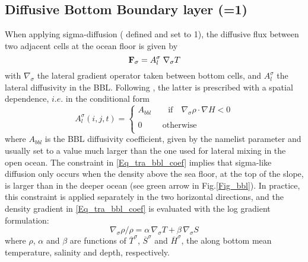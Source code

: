\documentclass[NEMO_book]{subfiles}
\begin{document}
\subsection{Diffusive Bottom Boundary layer (=1)}
\label{TRA_bbl_diff}

When applying sigma-diffusion ( defined and  set to 1), 
the diffusive flux between two adjacent cells at the ocean floor is given by 
\begin{equation} \label{Eq_tra_bbl_diff}
{\rm {\bf F}}_\sigma=A_l^\sigma \; \nabla_\sigma T
\end{equation} 
with $\nabla_\sigma$ the lateral gradient operator taken between bottom cells, 
and  $A_l^\sigma$ the lateral diffusivity in the BBL. Following \citet{Beckmann_Doscher1997}, 
the latter is prescribed with a spatial dependence, $i.e.$ in the conditional form
\begin{equation} \label{Eq_tra_bbl_coef}
A_l^\sigma (i,j,t)=\left\{ {\begin{array}{l}
 A_{bbl}  \quad \quad   \mbox{if}  \quad   \nabla_\sigma \rho  \cdot  \nabla H<0 \\ 
 \\
 0\quad \quad \;\,\mbox{otherwise} \\ 
 \end{array}} \right.
\end{equation} 
where $A_{bbl}$ is the BBL diffusivity coefficient, given by the namelist 
parameter  and usually set to a value much larger 
than the one used for lateral mixing in the open ocean. The constraint in \eqref{Eq_tra_bbl_coef} 
implies that sigma-like diffusion only occurs when the density above the sea floor, at the top of 
the slope, is larger than in the deeper ocean (see green arrow in Fig.\ref{Fig_bbl}). 
In practice, this constraint is applied separately in the two horizontal directions, 
and the density gradient in \eqref{Eq_tra_bbl_coef} is evaluated with the log gradient formulation: 
\begin{equation} \label{Eq_tra_bbl_Drho}
	\nabla_\sigma \rho / \rho = \alpha \,\nabla_\sigma T + \beta   \,\nabla_\sigma S
\end{equation} 
where $\rho$, $\alpha$ and $\beta$ are functions of $\overline{T}^\sigma$, 
$\overline{S}^\sigma$ and $\overline{H}^\sigma$, the along bottom mean temperature, 
salinity and depth, respectively.
\end{document}
